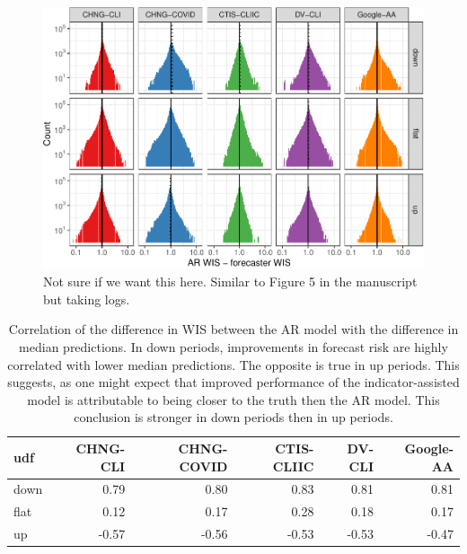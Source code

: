 \documentclass[9pt,twoside,lineno]{pnas-new}
\begin{document}
\clearpage

\begin{figure}

{\centering \includegraphics[width=\textwidth]{fig/upswing-histogram-logged-1} 

}

\caption{Not sure if we want this here. Similar to Figure 5 in the manuscript but taking logs. }\label{fig:upswing-histogram-logged}
\end{figure}

\clearpage

\begin{table}

\caption{\label{tab:upswing-corr-table}Correlation of the difference in WIS between the AR model with the difference in median predictions. In down periods, improvements in forecast risk are highly correlated with lower median predictions. The opposite is true in up periods. This suggests, as one might expect that improved performance of the indicator-assisted model is attributable to being closer to the truth then the AR model. This conclusion is stronger in down periods then in up periods.}
\centering
\begin{tabular}[t]{lrrrrr}
\toprule
udf & CHNG-CLI & CHNG-COVID & CTIS-CLIIC & DV-CLI & Google-AA\\
\midrule
down & 0.79 & 0.80 & 0.83 & 0.81 & 0.81\\
flat & 0.12 & 0.17 & 0.28 & 0.18 & 0.17\\
up & -0.57 & -0.56 & -0.53 & -0.53 & -0.47\\
\bottomrule
\end{tabular}
\end{table}
\end{document}

